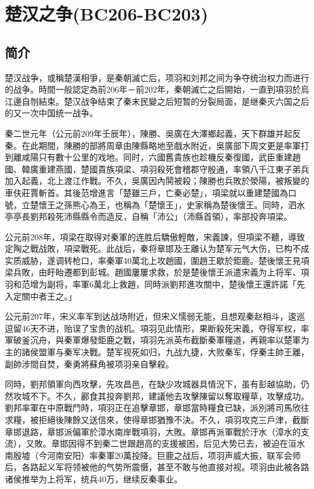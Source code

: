 
\section{楚汉之争\tiny(BC206-BC203)}

\subsection{简介}


楚汉战争，或稱楚漢相爭，是秦朝滅亡后，项羽和刘邦之间为争夺统治权力而进行的战争。時間一般認定為前206年－前202年，秦朝滅亡之后開始，一直到項羽於烏江邊自刎結束。楚汉战争结束了秦末民變之后短暂的分裂局面，是继秦灭六国之后的又一次中国统一战争。

秦二世元年（公元前209年壬辰年），陳勝、吳廣在大澤鄉起義，天下群雄并起反秦。在此期間，陳勝的部將周章由陳縣略地至戲水附近，吳廣部下周文更是率軍打到離咸陽只有數十公里的戏地。同时，六國舊貴族也趁機反秦復國，武臣重建趙國、韓廣重建燕國，楚國貴族項梁、項羽殺死會稽郡守殷通，率領八千江東子弟兵加入起義，北上渡江作戰。不久，吳廣因內鬨被殺；陳勝也兵敗於滎陽，被叛變的車伕莊賈斬首。其後范增進言「楚雖三戶，亡秦必楚」，項梁就以重建楚國為口號，立楚懷王之孫熊心為王，也稱為「楚懷王」，史家稱為楚後懷王。同時，泗水亭亭長劉邦殺死沛縣縣令而造反，自稱「沛公」（沛縣首領），率部投奔項梁。

公元前208年，項梁在取得对秦軍的连胜后驕傲輕敵，宋義諫，但項梁不聽，導致定陶之戰战敗，項梁戰死。此战后，秦将章邯及王離认为楚军元气大伤，已构不成实质威胁，遂调转枪口，率秦軍40萬北上攻趙國，圍趙王歇於鉅鹿。楚後懷王見項梁兵敗，由盱眙遷都到彭城。趙國屢屢求救，於是楚後懷王派遣宋義为上将军、項羽和范增为副将，率軍6萬北上救趙，同時派劉邦進攻關中，楚後懷王還許諾「先入定關中者王之。」

公元前207年，宋义率军到达战场附近，但宋义懦弱无能，且想观秦赵相斗，逡巡逗留46天不进，贻误了宝贵的战机。項羽见此情形，果断殺死宋義，夺得军权，率軍破釜沉舟，與秦軍爆發鉅鹿之戰，項羽先派英布截斷秦軍糧道，再親率以楚軍为主的諸侯盟軍与秦军决戰。楚军视死如归，九战九捷，大败秦军，俘秦主帥王離，副帥涉間自焚，秦勇將蘇角被项羽亲自擊殺。

同時，劉邦領軍向西攻擊，先攻昌邑，在缺少攻城器具情況下，虽有彭越協助，仍然攻城不下。不久，酈食其投奔劉邦，建議他去攻擊陳留以奪取糧草，攻擊成功。劉邦率軍在中原戰鬥時，項羽正在追擊章邯，章邯當時糧食已缺，派別將司馬欣往求糧，被拒絕後陳餘又送信來，使得章邯猶豫不決。不久，項羽攻克三戶津，截斷章邯退路，章邯派偏軍於漳水南岸戰項羽，大敗。章邯再派軍戰於汙水（漳水的支流），又敗。章邯因得不到秦二世跟趙高的支援被困，后见大势已去，被迫在洹水南殷墟（今河南安阳）率秦軍20萬投降。巨鹿之战后，项羽声威大振，联军会师后，各路起义军将领被他的气势所震慑，甚至不敢与他直接对视。项羽由此被各路诸侯推举为上将军，统兵40万，继续反秦事业。

